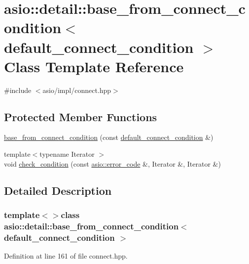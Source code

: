 \hypertarget{classasio_1_1detail_1_1base__from__connect__condition_3_01default__connect__condition_01_4}{}\section{asio\+:\+:detail\+:\+:base\+\_\+from\+\_\+connect\+\_\+condition$<$ default\+\_\+connect\+\_\+condition $>$ Class Template Reference}
\label{classasio_1_1detail_1_1base__from__connect__condition_3_01default__connect__condition_01_4}


{\ttfamily \#include $<$asio/impl/connect.\+hpp$>$}

\subsection*{Protected Member Functions}
\begin{DoxyCompactItemize}
\item 
\hyperlink{classasio_1_1detail_1_1base__from__connect__condition_3_01default__connect__condition_01_4_a41b517c5dcfb7003fa32dcf1037c409d}{base\+\_\+from\+\_\+connect\+\_\+condition} (const \hyperlink{structasio_1_1detail_1_1default__connect__condition}{default\+\_\+connect\+\_\+condition} \&)
\item 
{\footnotesize template$<$typename Iterator $>$ }\\void \hyperlink{classasio_1_1detail_1_1base__from__connect__condition_3_01default__connect__condition_01_4_afb5523149b13c2724dda770b525dd01b}{check\+\_\+condition} (const \hyperlink{classasio_1_1error__code}{asio\+::error\+\_\+code} \&, Iterator \&, Iterator \&)
\end{DoxyCompactItemize}


\subsection{Detailed Description}
\subsubsection*{template$<$$>$class asio\+::detail\+::base\+\_\+from\+\_\+connect\+\_\+condition$<$ default\+\_\+connect\+\_\+condition $>$}



Definition at line 161 of file connect.\+hpp.



